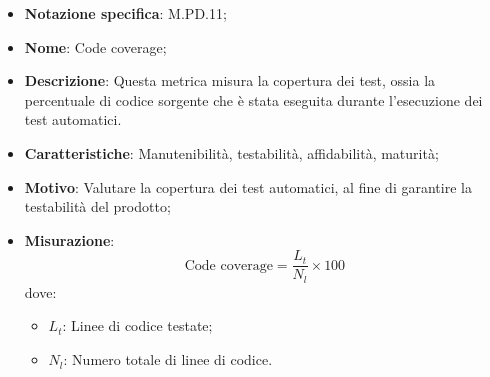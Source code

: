 \begin{itemize}
    \item \textbf{Notazione specifica}: M.PD.11;
    \item \textbf{Nome}: Code coverage;
    \item \textbf{Descrizione}: Questa metrica misura la copertura dei test, ossia la percentuale di codice sorgente che è stata eseguita durante l'esecuzione dei test automatici.
    \item \textbf{Caratteristiche}: Manutenibilità, testabilità, affidabilità, maturità;
    \item \textbf{Motivo}: Valutare la copertura dei test automatici, al fine di garantire la testabilità del prodotto;
    \item \textbf{Misurazione}: 
    \[
    \text{Code coverage} = \frac{L_{t}}{N_{l}} \times 100
    \]
    dove:
    \begin{itemize}
        \item $L_{t}$: Linee di codice testate;
        \item $N_{l}$: Numero totale di linee di codice.
    \end{itemize}
\end{itemize}
